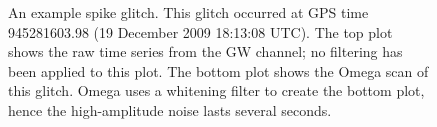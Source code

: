 \begin{figure}[hp]
\center
{}
\label{fig:spike_glitch-example}
\caption{An example spike glitch. This glitch occurred at GPS time 945281603.98
(19 December 2009 18:13:08 UTC). The top plot shows the raw time series from
the GW channel; no filtering has been applied to this plot. The bottom plot
shows the Omega scan of this glitch. Omega uses a whitening filter to create
the bottom plot, hence the high-amplitude noise lasts several seconds.}
\end{figure}

